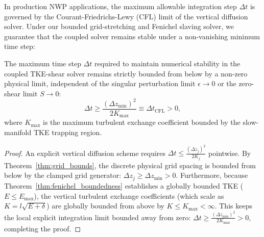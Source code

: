 In production NWP applications, the maximum allowable integration step $\Delta t$ is governed by the Courant-Friedrichs-Lewy (CFL) limit of the vertical diffusion solver. Under our bounded grid-stretching and Fenichel slaving solver, we guarantee that the coupled solver remains stable under a non-vanishing minimum time step:

\begin{proposition}
\label{prop:cfl_guarantee}
The maximum time step $\Delta t$ required to maintain numerical stability in the coupled TKE-shear solver remains strictly bounded from below by a non-zero physical limit, independent of the singular perturbation limit $\epsilon \to 0$ or the zero-shear limit $S \to 0$:
\begin{equation}
    \Delta t \ge \frac{(\Delta z_{\text{min}})^2}{2 K_{\text{max}}} \equiv \Delta t_{\text{CFL}} > 0, \label{eq:cfl_guarantee_formula}
\end{equation}
where $K_{\text{max}}$ is the maximum turbulent exchange coefficient bounded by the slow-manifold TKE trapping region.
\end{proposition}

\begin{proof}
An explicit vertical diffusion scheme requires $\Delta t \le \frac{(\Delta z_j)^2}{2 K_j}$ pointwise. By Theorem~\ref{thm:grid_bounds}, the discrete physical grid spacing is bounded from below by the clamped grid generator: $\Delta z_j \ge \Delta z_{\text{min}} > 0$. Furthermore, because Theorem~\ref{thm:fenichel_boundedness} establishes a globally bounded TKE ($E \le E_{\text{max}}$), the vertical turbulent exchange coefficients (which scale as $K = l \sqrt{E+\delta}$) are globally bounded from above by $K \le K_{\text{max}} < \infty$. This keeps the local explicit integration limit bounded away from zero: $\Delta t \ge \frac{(\Delta z_{\text{min}})^2}{2 K_{\text{max}}} > 0$, completing the proof.
\end{proof}